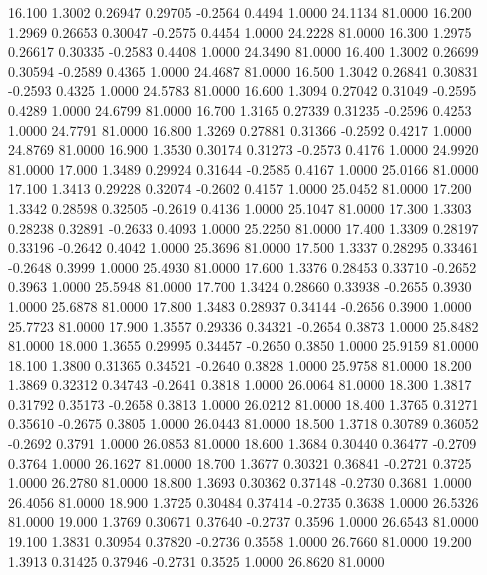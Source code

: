   16.100   1.3002   0.26947   0.29705  -0.2564   0.4494   1.0000  24.1134  81.0000
  16.200   1.2969   0.26653   0.30047  -0.2575   0.4454   1.0000  24.2228  81.0000
  16.300   1.2975   0.26617   0.30335  -0.2583   0.4408   1.0000  24.3490  81.0000
  16.400   1.3002   0.26699   0.30594  -0.2589   0.4365   1.0000  24.4687  81.0000
  16.500   1.3042   0.26841   0.30831  -0.2593   0.4325   1.0000  24.5783  81.0000
  16.600   1.3094   0.27042   0.31049  -0.2595   0.4289   1.0000  24.6799  81.0000
  16.700   1.3165   0.27339   0.31235  -0.2596   0.4253   1.0000  24.7791  81.0000
  16.800   1.3269   0.27881   0.31366  -0.2592   0.4217   1.0000  24.8769  81.0000
  16.900   1.3530   0.30174   0.31273  -0.2573   0.4176   1.0000  24.9920  81.0000
  17.000   1.3489   0.29924   0.31644  -0.2585   0.4167   1.0000  25.0166  81.0000
  17.100   1.3413   0.29228   0.32074  -0.2602   0.4157   1.0000  25.0452  81.0000
  17.200   1.3342   0.28598   0.32505  -0.2619   0.4136   1.0000  25.1047  81.0000
  17.300   1.3303   0.28238   0.32891  -0.2633   0.4093   1.0000  25.2250  81.0000
  17.400   1.3309   0.28197   0.33196  -0.2642   0.4042   1.0000  25.3696  81.0000
  17.500   1.3337   0.28295   0.33461  -0.2648   0.3999   1.0000  25.4930  81.0000
  17.600   1.3376   0.28453   0.33710  -0.2652   0.3963   1.0000  25.5948  81.0000
  17.700   1.3424   0.28660   0.33938  -0.2655   0.3930   1.0000  25.6878  81.0000
  17.800   1.3483   0.28937   0.34144  -0.2656   0.3900   1.0000  25.7723  81.0000
  17.900   1.3557   0.29336   0.34321  -0.2654   0.3873   1.0000  25.8482  81.0000
  18.000   1.3655   0.29995   0.34457  -0.2650   0.3850   1.0000  25.9159  81.0000
  18.100   1.3800   0.31365   0.34521  -0.2640   0.3828   1.0000  25.9758  81.0000
  18.200   1.3869   0.32312   0.34743  -0.2641   0.3818   1.0000  26.0064  81.0000
  18.300   1.3817   0.31792   0.35173  -0.2658   0.3813   1.0000  26.0212  81.0000
  18.400   1.3765   0.31271   0.35610  -0.2675   0.3805   1.0000  26.0443  81.0000
  18.500   1.3718   0.30789   0.36052  -0.2692   0.3791   1.0000  26.0853  81.0000
  18.600   1.3684   0.30440   0.36477  -0.2709   0.3764   1.0000  26.1627  81.0000
  18.700   1.3677   0.30321   0.36841  -0.2721   0.3725   1.0000  26.2780  81.0000
  18.800   1.3693   0.30362   0.37148  -0.2730   0.3681   1.0000  26.4056  81.0000
  18.900   1.3725   0.30484   0.37414  -0.2735   0.3638   1.0000  26.5326  81.0000
  19.000   1.3769   0.30671   0.37640  -0.2737   0.3596   1.0000  26.6543  81.0000
  19.100   1.3831   0.30954   0.37820  -0.2736   0.3558   1.0000  26.7660  81.0000
  19.200   1.3913   0.31425   0.37946  -0.2731   0.3525   1.0000  26.8620  81.0000
